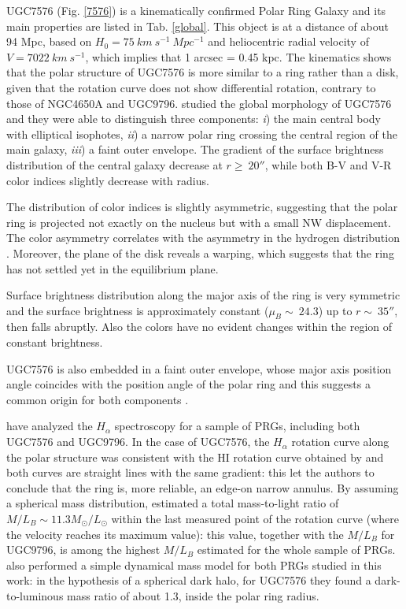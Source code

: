 \documentclass{aa}
\begin{document}
UGC7576 (Fig. \ref{7576}) is a kinematically confirmed Polar Ring
Galaxy \citep{Whi90} and its main properties are listed in
Tab. \ref{global}. This object is at a distance of about 94 Mpc, based
on $H_{0} = 75 \ km \ s^{-1} \ Mpc^{-1}$ and heliocentric radial
velocity of $V = 7022\ km \ s^{-1}$, which implies that 1 arcsec =
0.45 kpc. The kinematics shows that the polar structure of
UGC7576 is more similar to a ring rather than a disk, given that
  the rotation curve does not show differential rotation, contrary to
those of NGC4650A and UGC9796. \cite{Res94p} studied the global
morphology of UGC7576 and they were able to distinguish three
components: \emph{i}) the main central body with elliptical isophotes,
\emph{ii}) a narrow polar ring crossing the central region of the main
galaxy, \emph{iii}) a faint outer envelope. The gradient of the
surface brightness distribution of the central galaxy decrease at $r
\geq\ 20''$, while both B-V and V-R color indices slightly decrease
with radius.

The distribution of color
indices is slightly asymmetric, suggesting that the polar ring is
projected not exactly on the nucleus but with a small NW
displacement. The color asymmetry correlates with the asymmetry in the
hydrogen distribution \citep{Sch84}. Moreover, the plane of the disk
reveals a warping, which suggests that the ring has not settled yet in
the equilibrium plane.

Surface brightness distribution along the major axis of the ring is
very symmetric and the surface brightness is approximately constant
($\mu_{B} \sim\ 24.3$) up to $r \sim\ 35''$, then falls abruptly. Also
the colors have no evident changes within the region of constant brightness.

UGC7576 is also embedded in a faint outer
envelope, whose major axis position angle coincides with the position
angle of the polar ring and this suggests a common origin for both
components \citep{Res94p}.

\cite{Res94} have analyzed the $H_{\alpha}$ spectroscopy for a
sample of PRGs, including both UGC7576 and UGC9796.  In the case of
UGC7576, the $H_{\alpha}$ rotation curve along the polar structure was
consistent with the HI rotation curve obtained by \cite{Sch84} and
both curves are straight lines with the same gradient: this let the
authors to conclude that the ring is, more reliable, an edge-on
narrow annulus.  By assuming a spherical mass distribution,
\cite{Res94} estimated a total mass-to-light ratio of $M/L_{B} \sim
11.3 M_{\odot}/L_{\odot}$ within the last measured point of the
rotation curve (where the velocity reaches its maximum value): this
value, together with the $M/L_{B}$ for UGC9796, is
among the highest $M/L_{B}$ estimated for the whole sample of PRGs.
\cite{Res94} also performed a simple dynamical mass model for both PRGs
studied in this work: in the hypothesis of a spherical dark halo, for
UGC7576 they found a dark-to-luminous mass ratio of about 1.3, inside
the polar ring radius.
\end{document}
